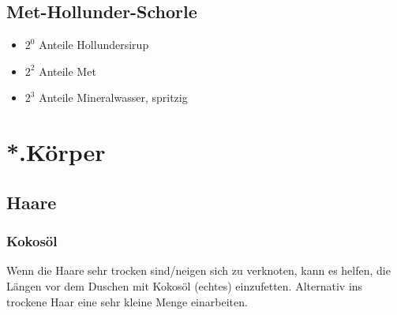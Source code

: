 \documentclass[oneside,12pt,a4paper]{scrartcl}
\begin{document}
\subsection{Met-Hollunder-Schorle}
\begin{itemize}
\item $2^{0}$ Anteile Hollundersirup
\item $2^{2}$ Anteile Met
\item $2^{3}$ Anteile Mineralwasser, spritzig
\end{itemize}

\section{*.Körper}
\subsection{Haare}
\subsubsection{Kokosöl}
Wenn die Haare sehr trocken sind/neigen sich zu verknoten, kann es helfen, die Längen vor dem Duschen mit Kokosöl (echtes) einzufetten. Alternativ ins trockene Haar eine sehr kleine Menge einarbeiten.
\end{document}
